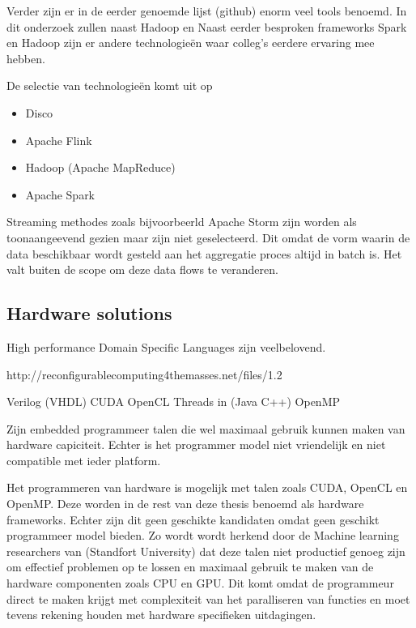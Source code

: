 Verder zijn er in de eerder genoemde lijst (github) enorm veel tools benoemd. In dit onderzoek zullen naast Hadoop en Naast eerder besproken frameworks Spark en Hadoop zijn er andere technologieën waar colleg's eerdere ervaring mee hebben.

De selectie van technologieën komt uit op

\begin{itemize}
    \item Disco
    \item Apache Flink
    \item Hadoop (Apache MapReduce)
    \item Apache Spark
\end{itemize}

Streaming methodes zoals bijvoorbeerld Apache Storm zijn worden als toonaangeevend gezien maar zijn niet geselecteerd. Dit omdat de vorm waarin de data beschikbaar wordt gesteld aan het aggregatie proces altijd in batch is. Het valt buiten de scope om deze data flows te veranderen.

\clearpage

\subsection{Hardware solutions}

High performance Domain Specific Languages zijn veelbelovend.

http://reconfigurablecomputing4themasses.net/files/1.2%

Verilog (VHDL)
CUDA
OpenCL
Threads in (Java C++)
OpenMP

Zijn embedded programmeer talen die wel maximaal gebruik kunnen maken van hardware capiciteit. Echter is het programmer model niet vriendelijk en niet compatible met ieder platform.



Het programmeren van hardware is mogelijk met talen zoals CUDA, OpenCL en OpenMP. Deze worden in de rest van deze thesis benoemd als hardware frameworks. Echter zijn dit geen geschikte kandidaten omdat geen geschikt programmeer model bieden. Zo wordt wordt herkend door de Machine learning researchers van (Standfort University) \cite{sujeeth2011optiml} dat deze talen niet productief genoeg zijn om effectief problemen op te lossen en maximaal gebruik te maken van de hardware componenten zoals CPU en GPU. Dit komt omdat de programmeur direct te maken krijgt met complexiteit van het paralliseren van functies en moet tevens rekening houden met hardware specifieken uitdagingen. \parencite{chafi2010language} \\

